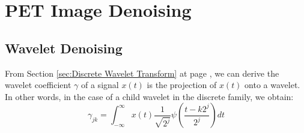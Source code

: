 \section{PET Image Denoising}





\iffalse
\begin{algorithm}
	\caption{Wavelet Denoising}\label{alg:waveletdenoising2}
	\begin{algorithmic}[1]
		\Require $image$
		\Ensure $denoise\_image$
		\Procedure{waveletdenoising($image$)}{}
		\State $\textit{stringlen} \gets \text{length of }\textit{string}$
		\State $i \gets \textit{patlen}$
		\BState \emph{top}:
		\If {$i > \textit{stringlen}$} \Return false
		\EndIf
		\State $j \gets \textit{patlen}$
		\BState \emph{loop}:
		\If {$\textit{string}(i) = \textit{path}(j)$}
		\State $j \gets j-1$.
		\State $i \gets i-1$.
		\State \textbf{goto} \emph{loop}.
		\State \textbf{close};
		\EndIf
		\State $i \gets i+\max(\textit{delta}_1(\textit{string}(i)),\textit{delta}_2(j))$.
		\State \textbf{goto} \emph{top}.
		\EndProcedure
	\end{algorithmic}
\end{algorithm}


\begin{algorithm}
	\caption{PDFB Decomposition}\label{alg:pdfbdec}
	\begin{algorithmic}[1]
		\Require $x, pfilt, dfilt, nlevs$
		\Ensure $y$
		\Procedure{pdfbdec($x, pfilt, dfilt, nlevs$)}{}
			\If {$nlev=0$}  \Comment Wavelet Decomposition
				\State $y=x$
			\Else \Comment Contourlet Decomposition
				\State get the pyramidal filters from the filter name \Comment $h, g$
					
			\EndIf
		\EndProcedure
	\end{algorithmic}	
\end{algorithm}
\fi




\subsection{Wavelet Denoising}

From Section \ref{sec:Discrete Wavelet Transform} at page \pageref{sec:Discrete Wavelet Transform}, we can derive the wavelet coefficient \(\gamma\) of a signal \(x(t)\) is
the projection of \(x(t)\) onto a wavelet. In other words, in the case of a child wavelet in the discrete family, we obtain:
\begin{equation}
\gamma_{jk} = \int_{-\infty}^{\infty} x(t)  \frac{1}{\sqrt{2^j}} \psi \left( \frac{t - k 2^j}{2^j} \right) dt
\end{equation}


